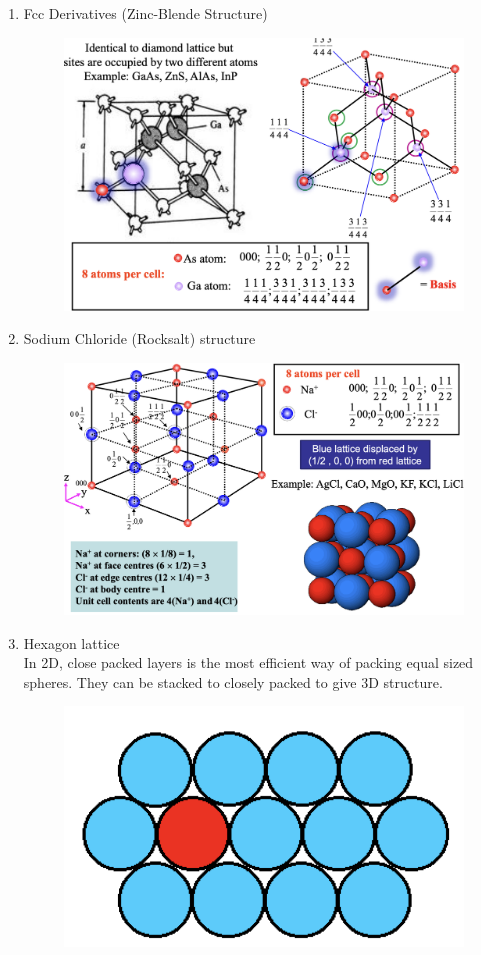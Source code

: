 \documentclass{article}
\begin{document}
\begin{enumerate}
\begin{figure}[h]
    \end{figure} 
    \newpage
    \item Fcc Derivatives (Zinc-Blende Structure) 
    \begin{figure}[h]
        \centering
        \includegraphics[width=0.75\linewidth]{image/zincblende.png}
    \end{figure}
    \item Sodium Chloride (Rocksalt) structure
    \begin{figure}[h]
        \centering
        \includegraphics[width=0.75\linewidth]{image/rockcet.png}
    \end{figure}
    \newpage
    \item Hexagon lattice \\
    In 2D, close packed layers is the most efficient way of packing equal sized spheres. They can be stacked to closely packed to give 3D structure.
    \begin{figure}[h]
        \centering
        \includegraphics[width=0.5\linewidth]{image/2dgraph.png}

\end{figure}
\end{enumerate}
\end{document}
